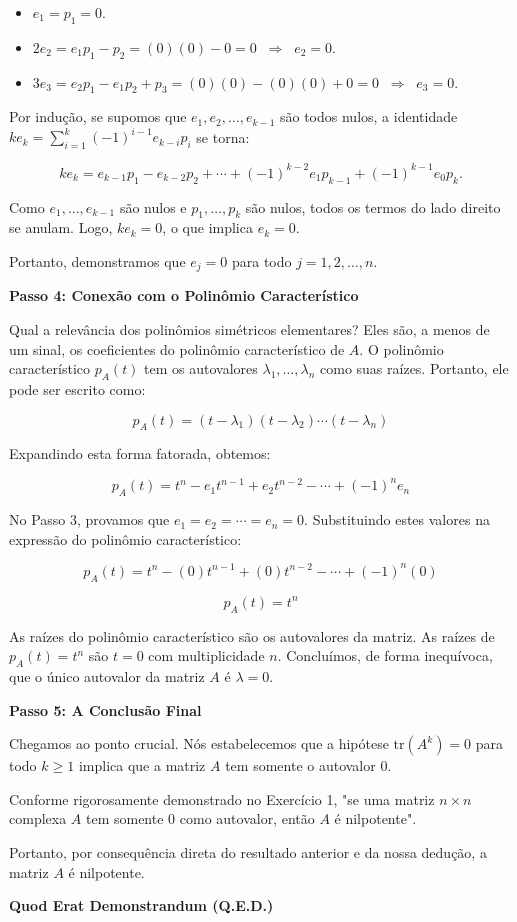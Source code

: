 \begin{itemize}
\item $e_1=p_1=0$.
\item $2e_2=e_1p_1-p_2=(0)(0)-0=0 \;\;\Longrightarrow\;\; e_2=0$.
\item $3e_3=e_2p_1-e_1p_2+p_3=(0)(0)-(0)(0)+0=0 \;\;\Longrightarrow\;\; e_3=0$.
\end{itemize}

Por indução, se supomos que $e_1,e_2,\ldots,e_{k-1}$ são todos nulos, a identidade
$ke_k=\sum_{i=1}^k (-1)^{i-1} e_{k-i}p_i$ se torna:

\[
ke_k=e_{k-1}p_1 - e_{k-2}p_2+\cdots+(-1)^{k-2} e_1p_{k-1}+(-1)^{k-1} e_0 p_k.
\]

Como $e_1,\ldots,e_{k-1}$ são nulos e $p_1,\ldots,p_k$ são nulos, todos os termos do lado direito se anulam.
Logo, $ke_k=0$, o que implica $e_k=0$.

Portanto, demonstramos que $e_j=0$ para todo $j=1,2,\ldots,n$.

\textbf{Passo 4: Conexão com o Polinômio Característico}

Qual a relevância dos polinômios simétricos elementares? Eles são, a menos de um sinal, os
coeficientes do polinômio característico de $A$. O polinômio característico $p_A(t)$ tem os autovalores
$\lambda_1,\ldots,\lambda_n$ como suas raízes. Portanto, ele pode ser escrito como:

\[
p_A(t)=(t-\lambda_1)(t-\lambda_2)\cdots(t-\lambda_n)
\]

Expandindo esta forma fatorada, obtemos:

\[
p_A(t)=t^n-e_1t^{n-1}+e_2t^{n-2}-\cdots+(-1)^n e_n
\]

No Passo 3, provamos que $e_1=e_2=\cdots=e_n=0$. Substituindo estes valores na expressão do
polinômio característico:

\[
p_A(t)=t^n-(0)t^{n-1}+(0)t^{n-2}-\cdots+(-1)^n(0)
\]

\[
p_A(t)=t^n
\]

As raízes do polinômio característico são os autovalores da matriz. As raízes de $p_A(t)=t^n$ são $t=0$
com multiplicidade $n$.
Concluímos, de forma inequívoca, que o único autovalor da matriz $A$ é $\lambda=0$.

\textbf{Passo 5: A Conclusão Final}

Chegamos ao ponto crucial. Nós estabelecemos que a hipótese $\mathrm{tr}(A^k)=0$ para todo $k \geq 1$
implica que a matriz $A$ tem somente o autovalor $0$.

Conforme rigorosamente demonstrado no Exercício 1, "se uma matriz $n\times n$ complexa $A$ tem
somente $0$ como autovalor, então $A$ é nilpotente".

Portanto, por consequência direta do resultado anterior e da nossa dedução, a matriz $A$ é nilpotente.

\textbf{Quod Erat Demonstrandum (Q.E.D.)}